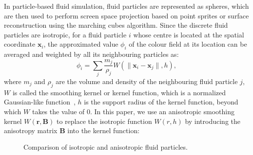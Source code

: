 \documentclass[times,twocolumn,final]{elsarticle}
\begin{document}
In particle-based fluid simulation, fluid particles are represented as spheres, which are then used to perform screen space projection based on point sprites or surface reconstruction using the marching cubes algorithm. Since the discrete fluid particles are isotropic, for a fluid particle $i$ whose centre is located at the spatial coordinate $\mathbf{x}_i$, the approximated value $\phi_i$ of the colour field at its location can be averaged and weighted by all its neighbouring particles as:
\begin{equation}
\phi_{i}=\sum_{j} \frac{m_{j}}{\rho_{j}} W\left(\|\mathbf{x}_i-\mathbf{x}_j\|, h\right),
\label{con:equa9}
\end{equation}
where $m_j$ and $\rho_j$ are the volume and density of the neighbouring fluid particle $j$, $W$ is called the smoothing kernel or kernel function, which is a normalized Gaussian-like function~\cite{Ihmsen14}, $h$ is the support radius of the kernel function, beyond which $W$ takes the value of 0. In this paper, we use an anisotropic smoothing kernel $W(\mathbf{r},\mathbf{B})$ to replace the isotropic function $W(r,h)$ by introducing the anisotropy matrix $\mathbf{B}$ into the kernel function:
\begin{figure}[!t]
    \centering
    \caption{Comparison of isotropic and anisotropic fluid particles.}
    \label{fig:figure3}
\end{figure}
\end{document}
